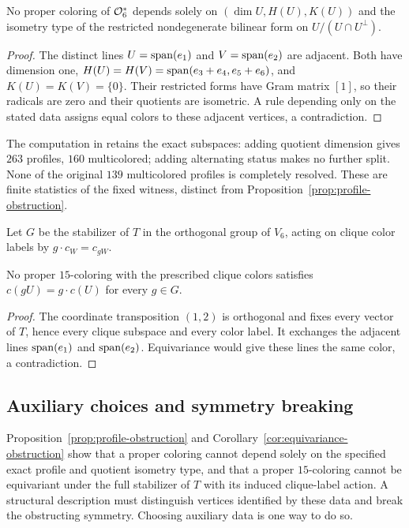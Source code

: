 \begin{proposition}\label{prop:profile-obstruction}
No proper coloring of \(\mathcal O_6^*\) depends solely on
\((\dim U,H(U),K(U))\) and the isometry type of the restricted
nondegenerate bilinear form on \(U/(U\cap U^\perp)\).
\end{proposition}
\begin{proof}
The distinct lines \(U=\operatorname{span}(e_1)\) and \(V=\operatorname{span}(e_2)\) are adjacent.
Both have dimension one,
\(H(U)=H(V)=\operatorname{span}(e_3+e_4,e_5+e_6)\), and
\(K(U)=K(V)=\{0\}\).  Their restricted forms have Gram matrix \([1]\),
so their radicals are zero and their quotients are isometric.
A rule depending only on the stated data assigns equal colors to
these adjacent vertices, a contradiction.
\end{proof}

The computation in 
retains the exact subspaces: adding quotient dimension gives \(263\)
profiles, \(160\) multicolored; adding alternating status makes no
further split.  None of the original \(139\) multicolored profiles
is completely resolved.  These are finite statistics of the fixed
witness, distinct from Proposition~\ref{prop:profile-obstruction}.

Let \(G\) be the stabilizer of \(T\) in the orthogonal group of
\(V_6\), acting on clique color labels by \(g\cdot c_W=c_{gW}\).
\begin{corollary}\label{cor:equivariance-obstruction}
No proper \(15\)-coloring with the prescribed clique colors satisfies
\(c(gU)=g\cdot c(U)\) for every \(g\in G\).
\end{corollary}
\begin{proof}
The coordinate transposition \((1,2)\) is orthogonal and fixes every
vector of \(T\), hence every clique subspace and every color label.
It exchanges the adjacent lines \(\operatorname{span}(e_1)\) and \(\operatorname{span}(e_2)\).
Equivariance would give these lines the same color, a contradiction.
\end{proof}

\subsection{Auxiliary choices and symmetry breaking}
\label{subsec:auxiliary}

Proposition~\ref{prop:profile-obstruction} and
Corollary~\ref{cor:equivariance-obstruction} show that a proper
coloring cannot depend solely on the specified exact profile and
quotient isometry type, and that a proper \(15\)-coloring cannot be
equivariant under the full stabilizer of \(T\) with its induced
clique-label action.  A structural description must distinguish
vertices identified by these data and break the obstructing symmetry.
Choosing auxiliary data is one way to do so.

